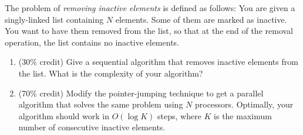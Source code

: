 The problem of {\em removing inactive elements} is defined as follows:
You are given a singly-linked list containing $N$ elements.  Some of
them are marked as inactive.  You want to have them removed from the
list, so that at the end of the removal operation, the list contains
no inactive elements.

\begin{enumerate}

	\item  (30\%  credit) Give a sequential algorithm that removes
	inactive elements from the list.  What is the complexity of
	your algorithm?

	\item  (70\%  credit) Modify the pointer-jumping technique to get
	a parallel algorithm that solves the same problem using $N$
	processors. Optimally, your algorithm should work in $O(\log
	K)$ steps, where $K$ is the maximum number of consecutive
	inactive elements.

\end{enumerate}
